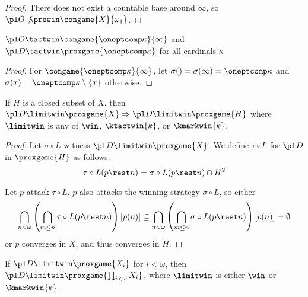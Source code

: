 \begin{proof}
  There does not exist a countable base around $\infty$, so 
    $\pl O \not\prewin \congame{X}{\omega_1}$.
\end{proof}

\begin{ex}
  $\pl O \tactwin \congame{\oneptcomp\kappa}{\infty}$ and 
  $\pl D \tactwin \proxgame{\oneptcomp\kappa}$ for all cardinals $\kappa$
\end{ex}

\begin{proof}
  For $\congame{\oneptcomp\kappa}{\infty}$, let 
    $\sigma()=\sigma(\infty)=\oneptcomp\kappa$ 
  and 
    $\sigma(x)=\oneptcomp\kappa\setminus\{x\}$ 
  otherwise.
\end{proof} 


\newpage

\begin{thm}
  If $H$ is a closed subset of $X$, then 
    $
      \pl D \limitwin \proxgame{X}
        \Rightarrow
      \pl D \limitwin \proxgame{H}
    $
  where $\limitwin$ is any of $\win$, $\ktactwin{k}$, or $\kmarkwin{k}$.
\end{thm}

\begin{proof}
  Let $\sigma\circ L$ witness $\pl D \limitwin \proxgame{X}$. We define
  $\tau\circ L$ for $\pl D$ in $\proxgame{H}$ as follows:
    \[
      \tau\circ L(p\rest n)
        =
      \sigma\circ L(p\rest n)
        \cap
      H^2
    \]

  Let $p$ attack $\tau\circ L$. $p$ also attacks the winning strategy 
  $\sigma\circ L$, so either 
    \[
      \bigcap_{n<\omega}
      \left(\bigcap_{m\leq n}\tau\circ L(p\rest n)\right)
      [p(n)]
        \subseteq
      \bigcap_{n<\omega}
      \left(\bigcap_{m\leq n}\sigma\circ L(p\rest n)\right)
      [p(n)]
        =
      \emptyset
    \]
  or $p$ converges in $X$, and thus converges in $H$.
\end{proof}

\begin{thm}
  If $\pl D\limitwin \proxgame{X_i}$ for $i<\omega$, then
  $\pl D\limitwin \proxgame{\prod_{i<\omega}X_i}$, where $\limitwin$ is either
  $\win$ or $\kmarkwin{k}$.
\end{thm}

